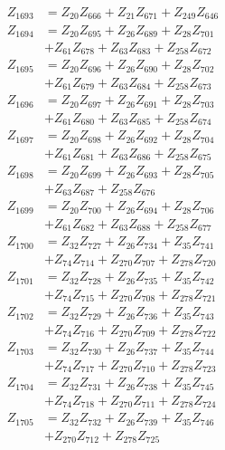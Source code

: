\begin{multicols}{2}
\begin{align}
Z_{1693} &= Z_{20}Z_{666} + Z_{21}Z_{671} + Z_{249}Z_{646} \nonumber \\
Z_{1694} &= Z_{20}Z_{695} + Z_{26}Z_{689} + Z_{28}Z_{701}  \nonumber \\
&+ Z_{61}Z_{678} + Z_{63}Z_{683} + Z_{258}Z_{672} \nonumber \\
Z_{1695} &= Z_{20}Z_{696} + Z_{26}Z_{690} + Z_{28}Z_{702}  \nonumber \\
&+ Z_{61}Z_{679} + Z_{63}Z_{684} + Z_{258}Z_{673} \nonumber \\
Z_{1696} &= Z_{20}Z_{697} + Z_{26}Z_{691} + Z_{28}Z_{703}  \nonumber \\
&+ Z_{61}Z_{680} + Z_{63}Z_{685} + Z_{258}Z_{674} \nonumber \\
Z_{1697} &= Z_{20}Z_{698} + Z_{26}Z_{692} + Z_{28}Z_{704}  \nonumber \\
&+ Z_{61}Z_{681} + Z_{63}Z_{686} + Z_{258}Z_{675} \nonumber \\
Z_{1698} &= Z_{20}Z_{699} + Z_{26}Z_{693} + Z_{28}Z_{705}  \nonumber \\
&+ Z_{63}Z_{687} + Z_{258}Z_{676} \nonumber \\
Z_{1699} &= Z_{20}Z_{700} + Z_{26}Z_{694} + Z_{28}Z_{706}  \nonumber \\
&+ Z_{61}Z_{682} + Z_{63}Z_{688} + Z_{258}Z_{677} \nonumber \\
Z_{1700} &= Z_{32}Z_{727} + Z_{26}Z_{734} + Z_{35}Z_{741}  \nonumber \\
&+ Z_{74}Z_{714} + Z_{270}Z_{707} + Z_{278}Z_{720} \nonumber \\
Z_{1701} &= Z_{32}Z_{728} + Z_{26}Z_{735} + Z_{35}Z_{742}  \nonumber \\
&+ Z_{74}Z_{715} + Z_{270}Z_{708} + Z_{278}Z_{721} \nonumber \\
Z_{1702} &= Z_{32}Z_{729} + Z_{26}Z_{736} + Z_{35}Z_{743}  \nonumber \\
&+ Z_{74}Z_{716} + Z_{270}Z_{709} + Z_{278}Z_{722} \nonumber \\
Z_{1703} &= Z_{32}Z_{730} + Z_{26}Z_{737} + Z_{35}Z_{744}  \nonumber \\
&+ Z_{74}Z_{717} + Z_{270}Z_{710} + Z_{278}Z_{723} \nonumber \\
Z_{1704} &= Z_{32}Z_{731} + Z_{26}Z_{738} + Z_{35}Z_{745}  \nonumber \\
&+ Z_{74}Z_{718} + Z_{270}Z_{711} + Z_{278}Z_{724} \nonumber \\
Z_{1705} &= Z_{32}Z_{732} + Z_{26}Z_{739} + Z_{35}Z_{746}  \nonumber \\
&+ Z_{270}Z_{712} + Z_{278}Z_{725} \nonumber \\

\end{align}
\end{multicols}
